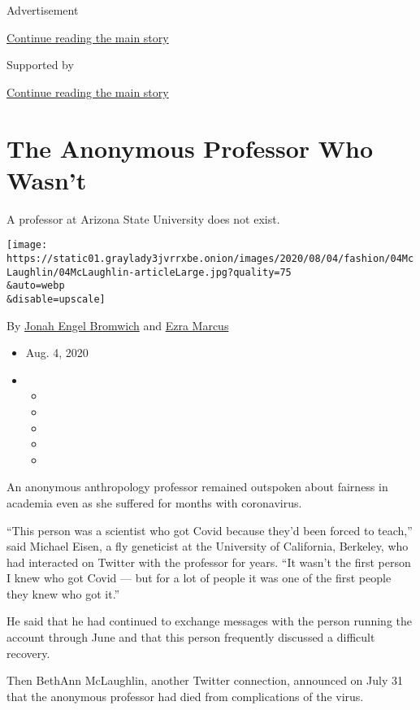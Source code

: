 Advertisement

\protect\hyperlink{after-top}{Continue reading the main story}

Supported by

\protect\hyperlink{after-sponsor}{Continue reading the main story}

\hypertarget{the-anonymous-professor-who-wasnt}{%
\section{The Anonymous Professor Who
Wasn't}\label{the-anonymous-professor-who-wasnt}}

A professor at Arizona State University does not exist.

\texttt{[image: https://static01.graylady3jvrrxbe.onion/images/2020/08/04/fashion/04McLaughlin/04McLaughlin-articleLarge.jpg?quality=75\\\&auto=webp\\\&disable=upscale]}

By
\href{https://www.nytimes3xbfgragh.onion/by/jonah-engel-bromwich}{Jonah
Engel Bromwich} and
\href{https://www.nytimes3xbfgragh.onion/by/ezra-marcus}{Ezra Marcus}

\begin{itemize}
\item
  Aug. 4, 2020
\item
  \begin{itemize}
  \item
  \item
  \item
  \item
  \item
  \end{itemize}
\end{itemize}

An anonymous anthropology professor remained outspoken about fairness in
academia even as she suffered for months with coronavirus.

``This person was a scientist who got Covid because they'd been forced
to teach,'' said Michael Eisen, a fly geneticist at the University of
California, Berkeley, who had interacted on Twitter with the professor
for years. ``It wasn't the first person I knew who got Covid --- but for
a lot of people it was one of the first people they knew who got it.''

He said that he had continued to exchange messages with the person
running the account through June and that this person frequently
discussed a difficult recovery.

Then BethAnn McLaughlin, another Twitter connection, announced on July
31 that the anonymous professor had died from complications of the
virus.

